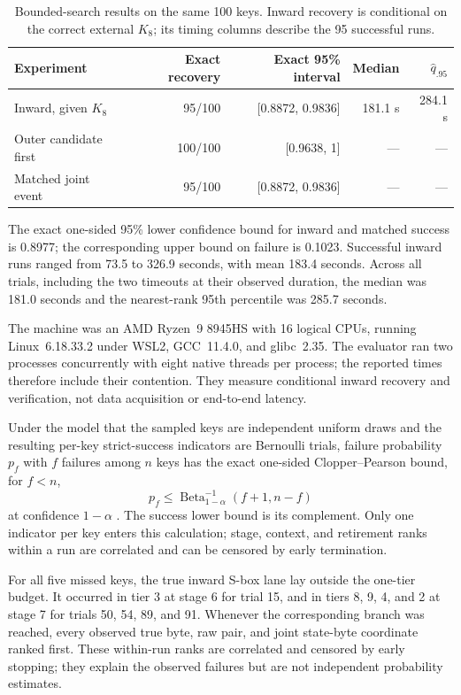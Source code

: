 \documentclass[10pt]{article}
\newcommand{\toprule}{\hline}
\newcommand{\midrule}{\hline}
\newcommand{\bottomrule}{\hline}}
\theoremstyle{plain}
\theoremstyle{definition}
\theoremstyle{remark}
\begin{document}
\begin{table}[ht]
\centering
\caption{Bounded-search results on the same 100 keys.  Inward recovery is
conditional on the correct external \(K_8\); its timing columns describe the
95 successful runs.}
\label{tab:bounded-results}
\small
\begin{tabular}{lrrrr}
\toprule
Experiment & Exact recovery & Exact 95\% interval & Median & \(\widehat q_{.95}\) \\ \midrule
Inward, given \(K_8\) & 95/100 & [0.8872, 0.9836] & 181.1 s & 284.1 s \\
Outer candidate first & 100/100 & [0.9638, 1] & --- & --- \\
Matched joint event & 95/100 & [0.8872, 0.9836] & --- & --- \\
\bottomrule
\end{tabular}
\end{table}

The exact one-sided 95\% lower confidence bound for inward and matched success
is 0.8977; the corresponding upper bound on failure is 0.1023.  Successful
inward runs ranged from 73.5 to 326.9 seconds, with mean 183.4 seconds.  Across
all trials, including the two timeouts at their observed duration, the median
was 181.0 seconds and the nearest-rank 95th percentile was 285.7 seconds.

The machine was an AMD Ryzen~9 8945HS with 16 logical CPUs, running
Linux~6.18.33.2 under WSL2, GCC~11.4.0, and glibc~2.35.  The evaluator ran two
processes concurrently with eight native threads per process; the reported
times therefore include their contention.  They measure conditional inward
recovery and verification, not data acquisition or end-to-end latency.

Under the model that the sampled keys are independent uniform draws and
the resulting per-key strict-success indicators are Bernoulli trials, failure
probability \(p_f\) with \(f\) failures among \(n\) keys has the exact
one-sided Clopper--Pearson bound, for \(f<n\),
\begin{equation}
p_f\leq \operatorname{Beta}^{-1}_{1-\alpha}(f+1,n-f)
\label{eq:cp}
\end{equation}
at confidence \(1-\alpha\) \cite{ClopperPearson1934}.  The success lower bound
is its complement.  Only one indicator per key enters this calculation;
stage, context, and retirement ranks within a run are correlated and can be
censored by early termination.

For all five missed keys, the true inward S-box lane lay outside the one-tier
budget.  It occurred
in tier 3 at stage 6 for trial 15, and in tiers 8, 9, 4, and 2 at stage 7 for
trials 50, 54, 89, and 91.  Whenever the corresponding branch was reached,
every observed true byte, raw pair, and joint state-byte coordinate ranked
first.  These within-run ranks are correlated and censored by early stopping;
they explain the observed failures but are not independent probability
estimates.
\end{document}
